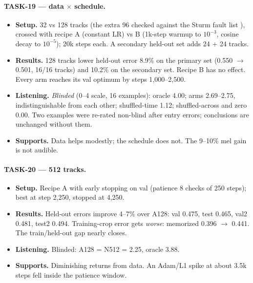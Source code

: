 \documentclass[10pt,letterpaper]{article}
\begin{document}
\paragraph{TASK-19 --- data $\times$ schedule.}
\begin{itemize}
\item \textbf{Setup.} 32 vs 128 tracks (the extra 96 checked against the Sturm fault list \citep{sturm2013gtzan}), crossed with recipe A (constant LR) vs B (1k-step warmup to $10^{-3}$, cosine decay to $10^{-5}$); 20k steps each. A secondary held-out set adds 24 + 24 tracks.
\item \textbf{Results.} 128 tracks lower held-out error 8.9\% on the primary set (0.550 $\to$ 0.501, 16/16 tracks) and 10.2\% on the secondary set. Recipe B has no effect. Every arm reaches its val optimum by steps 1{,}000--2{,}500.
\item \textbf{Listening.} \emph{Blinded} (0--4 scale, 16 examples): oracle 4.00; arms 2.69--2.75, indistinguishable from each other; shuffled-time 1.12; shuffled-across and zero 0.00. Two examples were re-rated non-blind after entry errors; conclusions are unchanged without them.
\item \textbf{Supports.} Data helps modestly; the schedule does not. The 9--10\% mel gain is not audible.
\end{itemize}

\paragraph{TASK-20 --- 512 tracks.}
\begin{itemize}
\item \textbf{Setup.} Recipe A with early stopping on val (patience 8 checks of 250 steps); best at step 2{,}250, stopped at 4{,}250.
\item \textbf{Results.} Held-out errors improve 4--7\% over A128: val 0.475, test 0.465, val2 0.481, test2 0.494. Training-crop error gets \emph{worse}: memorized 0.396 $\to$ 0.441. The train/held-out gap nearly closes.
\item \textbf{Listening.} Blinded: A128 = N512 = 2.25, oracle 3.88.
\item \textbf{Supports.} Diminishing returns from data. An Adam/L1 spike at about 3.5k steps fell inside the patience window.
\end{itemize}
\end{document}
